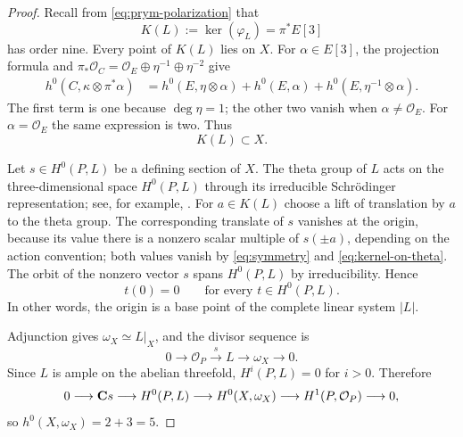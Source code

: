 \begin{proof}
Recall from \eqref{eq:prym-polarization} that
\[
 K(L):=\ker(\varphi_L)=\pi^*E[3]
\]
has order nine.  Every point of $K(L)$ lies on $X$.  For
$\alpha\in E[3]$, the projection formula and
$\pi_*\mathcal O_C=\mathcal O_E\oplus\eta^{-1}\oplus\eta^{-2}$ give
\[
\begin{aligned}
 h^0(C,\kappa\otimes\pi^*\alpha)
 &=h^0(E,\eta\otimes\alpha)+h^0(E,\alpha)
   +h^0(E,\eta^{-1}\otimes\alpha).
\end{aligned}
\]
The first term is one because $\deg\eta=1$; the other two vanish when
$\alpha\ne\mathcal O_E$.  For $\alpha=\mathcal O_E$ the same expression is
two.  Thus
\begin{equation}
 K(L)\subset X.
\label{eq:kernel-on-theta}
\end{equation}

Let $s\in H^0(P,L)$ be a defining section of $X$.  The theta group of $L$
acts on the three-dimensional space $H^0(P,L)$ through its irreducible
Schr\"odinger representation; see, for example,
\cite[Chapter~6]{BirkenhakeLange2004}.  For $a\in K(L)$ choose a lift of
translation by $a$ to the theta group.  The corresponding translate of $s$
vanishes at the origin, because its value there is a nonzero scalar multiple
of $s(\pm a)$, depending on the action convention; both values vanish by
\eqref{eq:symmetry} and \eqref{eq:kernel-on-theta}.  The orbit of the
nonzero vector $s$ spans $H^0(P,L)$ by irreducibility.  Hence
\begin{equation}
 t(0)=0\qquad\text{for every }t\in H^0(P,L).
\label{eq:basepoint-origin}
\end{equation}
In other words, the origin is a base point of the complete linear system
$|L|$.

Adjunction gives $\omega_X\simeq L|_X$, and the divisor sequence is
\[
 0\longrightarrow\mathcal O_P\xrightarrow{\,s\,}L
 \longrightarrow\omega_X\longrightarrow0.
\]
Since $L$ is ample on the abelian threefold, $H^i(P,L)=0$ for $i>0$.
Therefore
\begin{equation}
 0\longrightarrow \mathbf C s\longrightarrow H^0(P,L)
 \longrightarrow H^0(X,\omega_X)
 \longrightarrow H^1(P,\mathcal O_P)\longrightarrow0,
\label{eq:canonical-sections-exact}
\end{equation}
so $h^0(X,\omega_X)=2+3=5$.


\end{proof}
